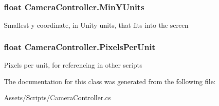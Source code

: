 \subsubsection[{\texorpdfstring{Min\+Y\+Units}{MinYUnits}}]{\setlength{\rightskip}{0pt plus 5cm}float Camera\+Controller.\+Min\+Y\+Units\hspace{0.3cm}{\ttfamily [static]}}\hypertarget{class_camera_controller_a66577648bab85619c6e72059e0ac4029}{}\label{class_camera_controller_a66577648bab85619c6e72059e0ac4029}


Smallest y coordinate, in Unity units, that fits into the screen 

\subsubsection[{\texorpdfstring{Pixels\+Per\+Unit}{PixelsPerUnit}}]{\setlength{\rightskip}{0pt plus 5cm}float Camera\+Controller.\+Pixels\+Per\+Unit\hspace{0.3cm}{\ttfamily [static]}}\hypertarget{class_camera_controller_a382108f331b87cc67e6694cde84b3910}{}\label{class_camera_controller_a382108f331b87cc67e6694cde84b3910}


Pixels per unit, for referencing in other scripts 



The documentation for this class was generated from the following file\+:\begin{DoxyCompactItemize}
\item 
Assets/\+Scripts/Camera\+Controller.\+cs\end{DoxyCompactItemize}
